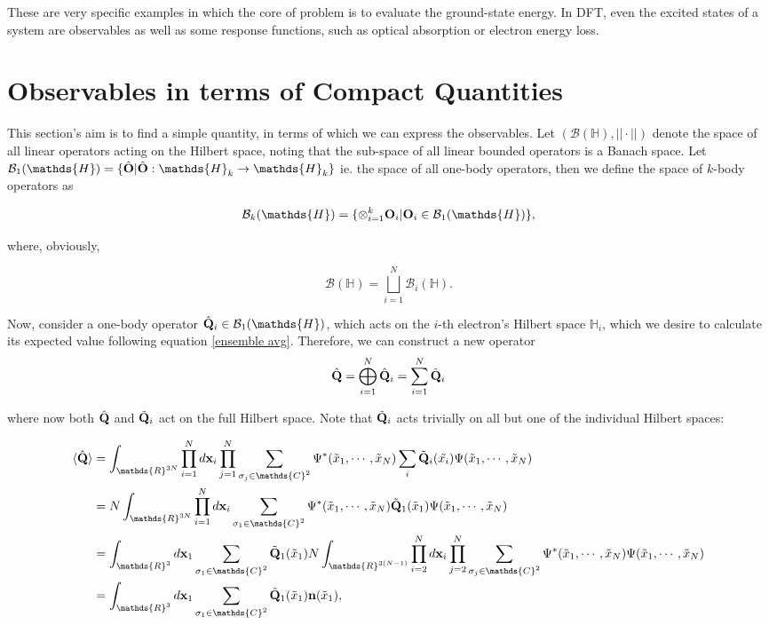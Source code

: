 \documentclass{homework}
\begin{document}
These are very specific examples in which the core of problem is to evaluate the ground-state energy. In DFT, even the excited states of a system are observables as well as some response functions, such as optical absorption or electron energy loss. \\

\section{Observables in terms of Compact Quantities}

This section's aim is to find a simple quantity, in terms of which we can express the observables. Let $(\mathcal{B}(\mathds{H}), ||\cdot||)$ denote the space of all linear operators acting on the Hilbert space, noting that the sub-space of all linear bounded operators is a Banach space. Let $\mathcal{B}_1(\mathds{H})=\{\hat{\bf O}| \hat{\bf O}:\mathds{H}_k \rightarrow \mathds{H}_k \}$ ie. the space of all one-body operators, then we define the space of $k$-body operators as 

$$
\mathcal{B}_k(\mathds{H}) = \{\otimes_{i=1}^{k} {\bf O}_i | {\bf O}_i \in \mathcal{B}_1(\mathds{H}) \},
$$

where, obviously,

$$
\mathcal{B}(\mathds{H}) = \bigsqcup_{i=1}^{N} \mathcal{B}_i(\mathds{H}).
$$

Now, consider a one-body operator $\hat{\bf Q}_i \in \mathcal{B}_{1}(\mathds{H})$, which acts on the $i$-th electron's Hilbert space $\mathds{H}_i$, which we desire to calculate its expected value following equation \eqref{ensemble avg}. Therefore, we can construct a new operator 
$$
\hat{\bf Q} = \bigoplus_{i=1}^{N} \hat{\bf Q}_i = \sum_{i=1}^{N} \tilde{\bf Q}_i
$$

where now both $\hat{\bf Q}$ and $\tilde{\bf Q}_i$ act on the full Hilbert space. Note that $\tilde{\bf Q}_i$ acts trivially on all but one of the individual Hilbert spaces:

\begin{align}
     \langle \hat{\bf Q} \rangle &= \int_{\mathds{R}^{3N}} \prod_{i=1}^N d{\bf x}_i \prod_{j=1}^{N} \sum_{\sigma_j \in \mathds{C}^2} \Psi^{*}(\tilde{x}_1, \cdots, \tilde{x}_N)
     \sum_{i}
     \tilde{\bf Q}_i(\tilde{x_i})
     \Psi(\tilde{x}_1, \cdots, \tilde{x}_N) \\
     &= N \int_{\mathds{R}^{3N}} \prod_{i=1}^N d{\bf x}_i \sum_{\sigma_1 \in \mathds{C}^2} \Psi^{*}(\tilde{x}_1, \cdots, \tilde{x}_N)
     \tilde{\bf Q}_1(\tilde{x}_1)
     \Psi(\tilde{x}_1, \cdots, \tilde{x}_N) \\
     &= \int_{\mathds{R}^{3}} d{\bf x}_1 \sum_{\sigma_1 \in \mathds{C}^2} \tilde{\bf Q}_1(\tilde{x}_1) N \int_{\mathds{R}^{3(N-1)}} \prod_{i=2}^N d{\bf x}_i \prod_{j=2}^{N} \sum_{\sigma_j \in \mathds{C}^2} \Psi^{*}(\tilde{x}_1, \cdots, \tilde{x}_N)
     \Psi(\tilde{x}_1, \cdots, \tilde{x}_N) \\
     &= \int_{\mathds{R}^{3}} d{\bf x}_1 \sum_{\sigma_1 \in \mathds{C}^2} \tilde{\bf Q}_1(\tilde{x}_1) {\bf n}(\tilde{x}_1),
\label{one-body ensemble avg}
\end{align}
\end{document}
